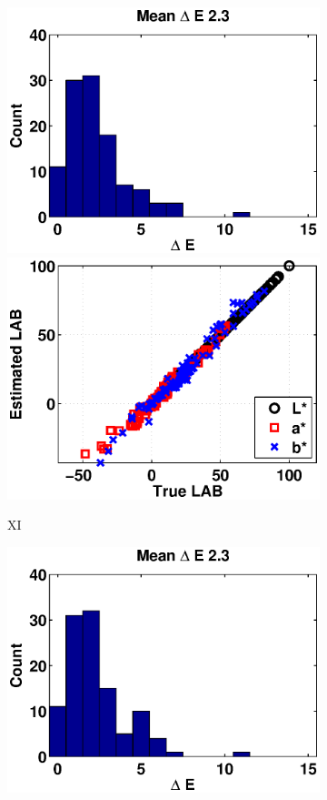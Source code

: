 \documentclass[]{spie}
\begin{document}
\begin{figure}
\begin{subfigure}[b]{0.325\textwidth}
    \includegraphics[width=\textwidth]{Hist_XI}
    \includegraphics[width=\textwidth]{DeltaE_XI}
    \caption{XI}
\end{subfigure}
\begin{subfigure}[b]{0.325\textwidth}
    \includegraphics[width=\textwidth]{Hist_Tun}

\end{subfigure}
\end{figure}
\end{document}
